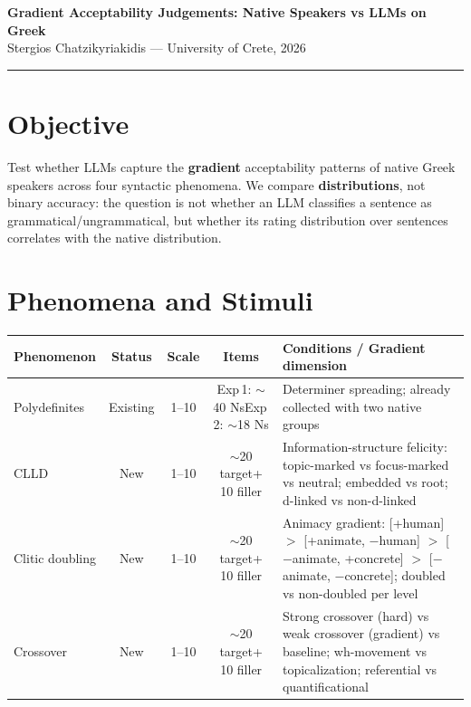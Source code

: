 \documentclass[11pt,a4paper]{article}
\begin{document}
\begin{center}
{\large\bfseries Gradient Acceptability Judgements: Native Speakers vs LLMs on Greek}\\[4pt]
{\small\color{gray} Stergios Chatzikyriakidis --- University of Crete, 2026}\\[2pt]
\textcolor{uocgreen}{\rule{\textwidth}{0.5pt}}
\end{center}

\section{Objective}

Test whether LLMs capture the \textbf{gradient} acceptability patterns of native Greek speakers across four syntactic phenomena. We compare \textbf{distributions}, not binary accuracy: the question is not whether an LLM classifies a sentence as grammatical/ungrammatical, but whether its rating distribution over sentences correlates with the native distribution.

\section{Phenomena and Stimuli}

\begin{table}[h!]
\centering
\small
\begin{tabularx}{\textwidth}{l c c c X}
\toprule
\textbf{Phenomenon} & \textbf{Status} & \textbf{Scale} & \textbf{Items} & \textbf{Conditions / Gradient dimension} \\
\midrule
Polydefinites & Existing & 1--10 & Exp\,1: $\sim$40 Ns\newline Exp\,2: $\sim$18 Ns & Determiner spreading; already collected with two native groups \\[6pt]
CLLD & New & 1--10 & $\sim$20 target\newline + 10 filler & Information-structure felicity: topic-marked vs focus-marked vs neutral; embedded vs root; d-linked vs non-d-linked \\[6pt]
Clitic doubling & New & 1--10 & $\sim$20 target\newline + 10 filler & Animacy gradient: [+human] $>$ [+animate, $-$human] $>$ [$-$animate, +concrete] $>$ [$-$animate, $-$concrete]; doubled vs non-doubled per level \\[6pt]
Crossover & New & 1--10 & $\sim$20 target\newline + 10 filler & Strong crossover (hard) vs weak crossover (gradient) vs baseline; wh-movement vs topicalization; referential vs quantificational \\
\bottomrule
\end{tabularx}
\end{table}
\end{document}
